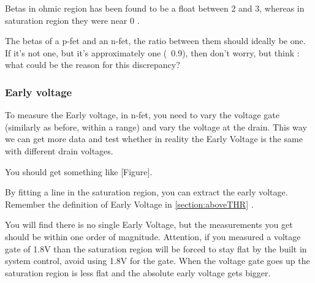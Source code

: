 Betas in ohmic region has been found to be a float between 2 and 3, whereas in saturation region they were near 0 . 

The betas of a p-fet and an n-fet, the ratio between them should ideally be one. If it's not one, but it's approximately one (~0.9), then don't worry, but think : what could be the reason for this discrepancy?

\subsubsection{Early voltage}

To measure the Early voltage, in n-fet, you need to vary the voltage gate (similarly as before, within a range) and vary the voltage at the drain. This way we can get more data and test whether in reality the Early Voltage is the same with different drain voltages. 

You should get something like [Figure].

By fitting a line in the saturation region, you can extract the early voltage. Remember the definition of Early Voltage in \ref{section:aboveTHR} . 

You will find there is no single Early Voltage, but the measurements you get should be within one order of magnitude.
Attention, if you measured a voltage gate of 1.8V than the saturation region will be forced to stay flat by the built in system control, avoid using 1.8V for the gate. 
When the voltage gate goes up the saturation region is less flat and the absolute early voltage gets bigger.

